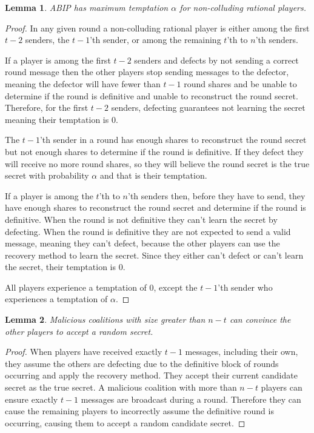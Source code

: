\documentclass[12pt]{dalcsthesis}
\newtheorem{lemma}{Lemma}
\begin{document}
\begin{lemma}\label{Lem:ABIP:SoloTemptation}ABIP has maximum temptation $\alpha$ for non-colluding rational players.\end{lemma}
\begin{proof}
In any given round a non-colluding rational player is either among the first $t-2$ senders, the $t-1$'th sender, or among the remaining $t$'th to $n$'th senders.

If a player is among the first $t-2$ senders and defects by not sending a correct round message then the other players stop sending messages to the defector, meaning the defector will have fewer than $t-1$ round shares and be unable to determine if the round is definitive and unable to reconstruct the round secret. Therefore, for the first $t-2$ senders, defecting guarantees not learning the secret meaning their temptation is $0$.

The $t-1$'th sender in a round has enough shares to reconstruct the round secret but not enough shares to determine if the round is definitive. If they defect they will receive no more round shares, so they will believe the round secret is the true secret with probability $\alpha$ and that is their temptation.

If a player is among the $t$'th to $n$'th senders then, before they have to send, they have enough shares to reconstruct the round secret and determine if the round is definitive. When the round is not definitive they can't learn the secret by defecting. When the round is definitive they are not expected to send a valid message, meaning they can't defect, because the other players can use the recovery method to learn the secret. Since they either can't defect or can't learn the secret, their temptation is $0$.

All players experience a temptation of $0$, except the $t-1$'th sender who experiences a temptation of $\alpha$.
\end{proof}

\begin{lemma}\label{Lem:ABIP:LargeMalTricks}Malicious coalitions with size greater than $n-t$ can convince the other players to accept a random secret.\end{lemma}
\begin{proof}
When players have received exactly $t-1$ messages, including their own, they assume the others are defecting due to the definitive block of rounds occurring and apply the recovery method. They accept their current candidate secret as the true secret. A malicious coalition with more than $n-t$ players can ensure exactly $t-1$ messages are broadcast during a round. Therefore they can cause the remaining players to incorrectly assume the definitive round is occurring, causing them to accept a random candidate secret.
\end{proof}
\end{document}
